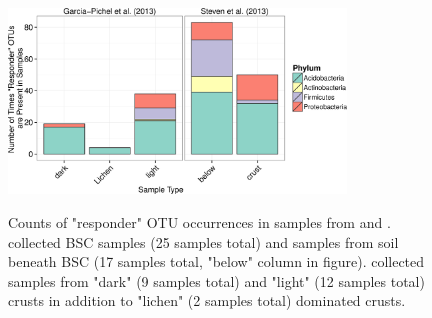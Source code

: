 \begin{figure}[H]
  \centering
  \caption{Counts of "responder" OTU occurrences in samples from \citet{Steven_2013} and \citet{Garcia_Pichel_2013}. \citet{Steven_2013} collected BSC samples (25 samples total) and samples from soil beneath BSC (17 samples total, "below" column in figure). \citet{Garcia_Pichel_2013} collected samples from "dark" (9 samples total) and "light" (12 samples total) crusts in addition to "lichen" (2 samples total) dominated crusts.}
    \includegraphics[width=0.8\textwidth]{figures/rspndr_dist/rspndr_dist.png}
  \label{fig:rspndr_dist}
\end{figure}
